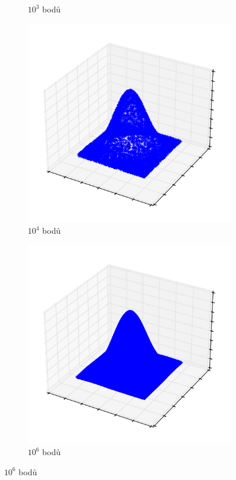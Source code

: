 \begin{figure}
\begin{subfigure}[t]{0.45\columnwidth}
    \caption{$10^3$ bodů}
\end{subfigure}
\hfill
\begin{subfigure}[t]{0.45\columnwidth}
    \centering
    \includegraphics[scale=0.5]{obrazky-figures/knn_norm/points_3d normal_plane_10000.png}
    \caption{$10^4$ bodů}
    \end{subfigure}
\hfill
\begin{subfigure}[t]{0.45\columnwidth}
\centering
\includegraphics[scale=0.45]{obrazky-figures/knn_norm/points_3d normal_plane_100000.png}
    \caption{$10^6$ bodů}
\end{subfigure}
\hfill


\end{figure}
